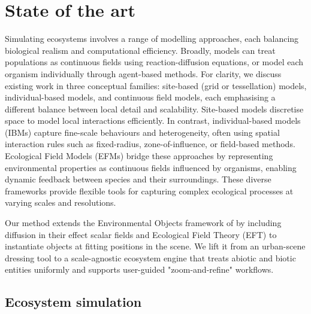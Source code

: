 












\section{State of the art}
\label{sec:env-obj-related-works}

Simulating ecosystems involves a range of modelling approaches, each balancing biological realism and computational efficiency. Broadly, models can treat populations as continuous fields using reaction-diffusion equations, or model each organism individually through agent-based methods. For clarity, we discuss existing work in three conceptual families: site-based (grid or tessellation) models, individual-based models, and continuous field models, each emphasising a different balance between local detail and scalability. Site-based models discretise space to model local interactions efficiently. In contrast, individual-based models (IBMs) capture fine-scale behaviours and heterogeneity, often using spatial interaction rules such as fixed-radius, zone-of-influence, or field-based methods. Ecological Field Models (EFMs) bridge these approaches by representing environmental properties as continuous fields influenced by organisms, enabling dynamic feedback between species and their surroundings. These diverse frameworks provide flexible tools for capturing complex ecological processes at varying scales and resolutions.

Our method extends the Environmental Objects framework of \citep{Grosbellet2016} by including diffusion in their effect scalar fields and Ecological Field Theory (EFT) to instantiate objects at fitting positions in the scene. We lift it from an urban-scene dressing tool to a scale-agnostic ecosystem engine that treats abiotic and biotic entities uniformly and supports user-guided "zoom-and-refine" workflows.

\subsection{Ecosystem simulation}

